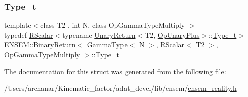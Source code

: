 \subsubsection{\texorpdfstring{Type\_t}{Type\_t}\hspace{0.1cm}{\footnotesize\ttfamily [2/2]}}
{\footnotesize\ttfamily template$<$class T2 , int N, class Op\+Gamma\+Type\+Multiply $>$ \\
typedef \mbox{\hyperlink{classENSEM_1_1RScalar}{R\+Scalar}}$<$typename \mbox{\hyperlink{structENSEM_1_1UnaryReturn}{Unary\+Return}}$<$T2, \mbox{\hyperlink{structENSEM_1_1OpUnaryPlus}{Op\+Unary\+Plus}}$>$\+::\mbox{\hyperlink{structENSEM_1_1BinaryReturn_3_01GammaType_3_01N_01_4_00_01RScalar_3_01T2_01_4_00_01OpGammaTypeMultiply_01_4_a943d82dee1746ec497924dece721a7d7}{Type\+\_\+t}}$>$ \mbox{\hyperlink{structENSEM_1_1BinaryReturn}{E\+N\+S\+E\+M\+::\+Binary\+Return}}$<$ \mbox{\hyperlink{classENSEM_1_1GammaType}{Gamma\+Type}}$<$ \mbox{\hyperlink{operator__name__util_8cc_a7722c8ecbb62d99aee7ce68b1752f337}{N}} $>$, \mbox{\hyperlink{classENSEM_1_1RScalar}{R\+Scalar}}$<$ T2 $>$, \mbox{\hyperlink{structENSEM_1_1OpGammaTypeMultiply}{Op\+Gamma\+Type\+Multiply}} $>$\+::\mbox{\hyperlink{structENSEM_1_1BinaryReturn_3_01GammaType_3_01N_01_4_00_01RScalar_3_01T2_01_4_00_01OpGammaTypeMultiply_01_4_a943d82dee1746ec497924dece721a7d7}{Type\+\_\+t}}}



The documentation for this struct was generated from the following file\+:\begin{DoxyCompactItemize}
\item 
/\+Users/archanar/\+Kinematic\+\_\+factor/adat\+\_\+devel/lib/ensem/\mbox{\hyperlink{lib_2ensem_2ensem__reality_8h}{ensem\+\_\+reality.\+h}}\end{DoxyCompactItemize}
